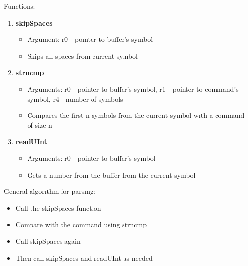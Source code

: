 Functions:

\begin{enumerate}
	\item \textbf{skipSpaces}
		\begin{itemize}
			\item Argument: r0 - pointer to buffer's symbol
			\item Skips all spaces from current symbol
		\end{itemize}
\item \textbf{strncmp}
	\begin{itemize}
		\item Arguments: r0 - pointer to buffer's symbol, r1 - pointer to command's symbol, r4 - number of symbols
		\item Compares the first n symbols from the current symbol with a command of size n
	\end{itemize}
\item \textbf{readUInt}
	\begin{itemize}
		\item Arguments: r0 - pointer to buffer's symbol
		\item Gets a number from the buffer from the current symbol
	\end{itemize}
\end{enumerate}

General algorithm for parsing:

\begin{itemize}
	\item Call the skipSpaces function
	\item Compare with the command using strncmp
	\item Call skipSpaces again
	\item Then call skipSpaces and readUInt as needed
\end{itemize}
